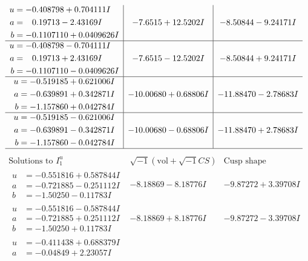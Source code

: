 \documentclass[1p]{elsarticle_modified}
\theoremstyle{definition}
\newcommand{\I}{\sqrt{-1}}
\begin{document}
$$\begin{array}{c|c|c}
\begin{aligned}
u &= -0.408798 + 0.704111 I \\
a &= \phantom{-}0.19713 - 2.43169 I \\
b &= -0.1107110 + 0.0409626 I\end{aligned}
 & -7.6515 + 12.5202 I & -8.50844 - 9.24171 I \\ \hline\begin{aligned}
u &= -0.408798 - 0.704111 I \\
a &= \phantom{-}0.19713 + 2.43169 I \\
b &= -0.1107110 - 0.0409626 I\end{aligned}
 & -7.6515 - 12.5202 I & -8.50844 + 9.24171 I \\ \hline\begin{aligned}
u &= -0.519185 + 0.621006 I \\
a &= -0.639891 + 0.342871 I \\
b &= -1.157860 + 0.042784 I\end{aligned}
 & -10.00680 + 0.68806 I & -11.88470 - 2.78683 I \\ \hline\begin{aligned}
u &= -0.519185 - 0.621006 I \\
a &= -0.639891 - 0.342871 I \\
b &= -1.157860 - 0.042784 I\end{aligned}
 & -10.00680 - 0.68806 I & -11.88470 + 2.78683 I\\
 \hline 
 \end{array}$$\newpage$$\begin{array}{c|c|c}  
\text{Solutions to }I^u_{1}& \I (\text{vol} + \sqrt{-1}CS) & \text{Cusp shape}\\
 \hline 
\begin{aligned}
u &= -0.551816 + 0.587844 I \\
a &= -0.721885 - 0.251112 I \\
b &= -1.50250 - 0.11783 I\end{aligned}
 & -8.18869 - 8.18776 I & -9.87272 + 3.39708 I \\ \hline\begin{aligned}
u &= -0.551816 - 0.587844 I \\
a &= -0.721885 + 0.251112 I \\
b &= -1.50250 + 0.11783 I\end{aligned}
 & -8.18869 + 8.18776 I & -9.87272 - 3.39708 I \\ \hline\begin{aligned}
u &= -0.411438 + 0.688379 I \\
a &= -0.04849 + 2.23057 I \\

\end{aligned}
\end{array}$$
\end{document}
